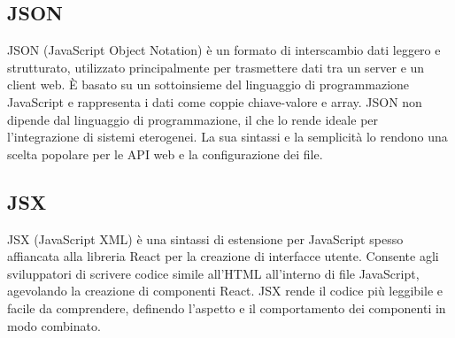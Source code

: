 \vspace{2em}
\subsection*{JSON}
\par JSON (JavaScript Object Notation) è un formato di interscambio dati leggero e strutturato, utilizzato principalmente per trasmettere dati tra un server e un client web. È basato su un sottoinsieme del linguaggio di programmazione JavaScript e rappresenta i dati come coppie chiave-valore e array. JSON non dipende dal linguaggio di programmazione, il che lo rende ideale per l'integrazione di sistemi eterogenei. La sua sintassi e la semplicità lo rendono una scelta popolare per le API web e la configurazione dei file.

\vspace{2em}
\subsection*{JSX}
\par JSX (JavaScript XML) è una sintassi di estensione per JavaScript spesso affiancata alla libreria React per la creazione di interfacce utente. Consente agli sviluppatori di scrivere codice simile all'HTML all'interno di file JavaScript, agevolando la creazione di componenti React. JSX rende il codice più leggibile e facile da comprendere, definendo l'aspetto e il comportamento dei componenti in modo combinato.
